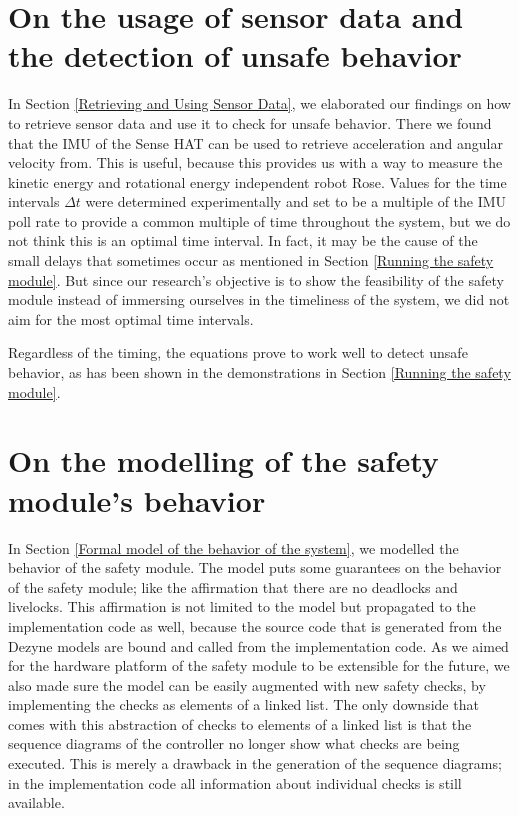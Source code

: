 \documentclass[12pt]{scrreprt}
\begin{document}
\section{On the usage of sensor data and the detection of unsafe behavior}
In Section \ref{Retrieving and Using Sensor Data}, we elaborated our findings on how to retrieve sensor data and use it to check for unsafe behavior. There we found that the IMU of the Sense HAT can be used to retrieve acceleration and angular velocity from. This is useful, because this provides us with a way to measure the kinetic energy and rotational energy independent robot Rose. Values for the time intervals $\Delta t$ were determined experimentally and set to be a multiple of the IMU poll rate to provide a common multiple of time throughout the system, but we do not think this is an optimal time interval. In fact, it may be the cause of the small delays that sometimes occur as mentioned in Section \ref{Running the safety module}. But since our research's objective is to show the feasibility of the safety module instead of immersing ourselves in the timeliness of the system, we did not aim for the most optimal time intervals.
\par
Regardless of the timing, the equations prove to work well to detect unsafe behavior, as has been shown in the demonstrations in Section \ref{Running the safety module}. 


\section{On the modelling of the safety module's behavior}
\label{On modelling safety module behavior}
In Section \ref{Formal model of the behavior of the system}, we modelled the behavior of the safety module. The model puts some guarantees on the behavior of the safety module; like the affirmation that there are no deadlocks and livelocks. This affirmation is not limited to the model but propagated to the implementation code as well, because the source code that is generated from the Dezyne models are bound and called from the implementation code. As we aimed for the hardware platform of the safety module to be extensible for the future, we also made sure the model can be easily augmented with new safety checks, by implementing the checks as elements of a linked list. The only downside that comes with this abstraction of checks to elements of a linked list is that the sequence diagrams of the controller no longer show what checks are being executed. This is merely a drawback in the generation of the sequence diagrams; in the implementation code all information about individual checks is still available.
\end{document}
